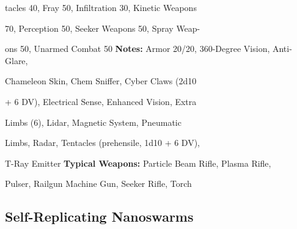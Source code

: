 tacles 40, Fray 50, Infiltration 30, Kinetic Weapons 

70, Perception 50, Seeker Weapons 50, Spray Weap-

ons 50, Unarmed Combat 50
\textbf{Notes:} Armor 20/20, 360-Degree Vision, Anti-Glare, 

Chameleon Skin, Chem Sniffer, Cyber Claws (2d10 

+ 6 DV), Electrical Sense, Enhanced Vision, Extra 

Limbs (6), Lidar, Magnetic System, Pneumatic 

Limbs, Radar, Tentacles (prehensile, 1d10 + 6 DV), 

T-Ray Emitter
\textbf{Typical Weapons:} Particle Beam Rifle, Plasma Rifle, 

Pulser, Railgun Machine Gun, Seeker Rifle, Torch

\subsection{Self-Replicating Nanoswarms}

